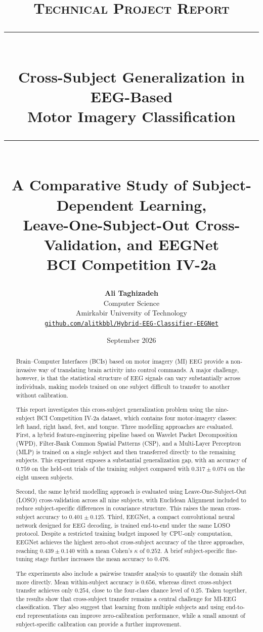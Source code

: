 \documentclass[11pt,a4paper]{article}
\title{
	\vspace{-2.2cm}
	{\large\scshape Technical Project Report}\\[0.45cm]
	\rule{\linewidth}{0.6pt}\\[0.3cm]
{\Huge \bfseries Cross-Subject Generalization in EEG-Based \\[0.2cm] Motor Imagery Classification}\\[0.3cm]
	\rule{\linewidth}{0.6pt}\\[0.45cm]
	{\large
		A Comparative Study of Subject-Dependent Learning,\\
		Leave-One-Subject-Out Cross-Validation, and EEGNet
	}\\[0.55cm]
	{\normalsize
		BCI Competition IV-2a
	}
}
\author{
	\textbf{Ali Taghizadeh}\\[0.15cm]
	\small
	Computer Science\\
	\small
	Amirkabir University of Technology\\[0.2cm]
	\small
	\href{https://github.com/alitkbbl/Hybrid-EEG-Classifier-EEGNet}
	{\texttt{github.com/alitkbbl/Hybrid-EEG-Classifier-EEGNet}}
}
\date{September 2026}
\begin{document}
	
	\maketitle
	\thispagestyle{empty}
	
	\vspace{-0.2cm}
	
	\begin{abstract}
		\noindent
		Brain--Computer Interfaces (BCIs) based on motor imagery (MI) EEG provide a non-invasive
		way of translating brain activity into control commands. A major challenge, however, is that
		the statistical structure of EEG signals can vary substantially across individuals, making
		models trained on one subject difficult to transfer to another without calibration.
		
		This report investigates this cross-subject generalization problem using the nine-subject
		BCI Competition IV-2a dataset, which contains four motor-imagery classes: left hand, right
		hand, feet, and tongue. Three modelling approaches are evaluated. First, a hybrid
		feature-engineering pipeline based on Wavelet Packet Decomposition (WPD), Filter-Bank Common
		Spatial Patterns (CSP), and a Multi-Layer Perceptron (MLP) is trained on a single subject and
		then transferred directly to the remaining subjects. This experiment exposes a substantial
		generalization gap, with an accuracy of $0.759$ on the held-out trials of the training subject
		compared with $0.317 \pm 0.074$ on the eight unseen subjects.
		
		Second, the same hybrid modelling approach is evaluated using Leave-One-Subject-Out (LOSO)
		cross-validation across all nine subjects, with Euclidean Alignment included to reduce
		subject-specific differences in covariance structure. This raises the mean cross-subject
		accuracy to $0.401 \pm 0.125$. Third, EEGNet, a compact convolutional neural network designed
		for EEG decoding, is trained end-to-end under the same LOSO protocol. Despite a restricted
		training budget imposed by CPU-only computation, EEGNet achieves the highest zero-shot
		cross-subject accuracy of the three approaches, reaching $0.439 \pm 0.140$ with a mean
		Cohen's $\kappa$ of $0.252$. A brief subject-specific fine-tuning stage further increases
		the mean accuracy to $0.476$.
		
		The experiments also include a pairwise transfer analysis to quantify the domain shift more
		directly. Mean within-subject accuracy is $0.656$, whereas direct cross-subject transfer
		achieves only $0.254$, close to the four-class chance level of $0.25$. Taken together, the
		results show that cross-subject transfer remains a central challenge for MI-EEG classification.
		They also suggest that learning from multiple subjects and using end-to-end representations
		can improve zero-calibration performance, while a small amount of subject-specific calibration
		can provide a further improvement.
	\end{abstract}
	
\end{document}
